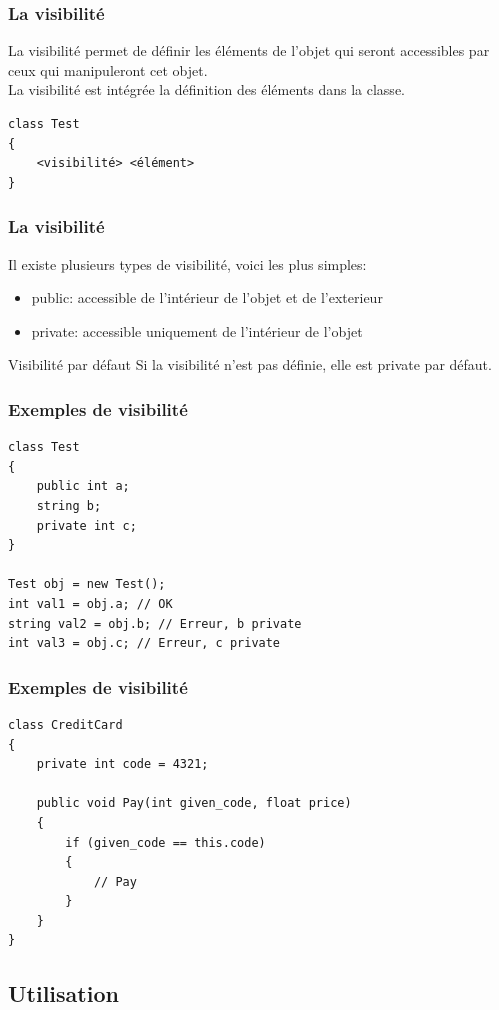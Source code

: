 \documentclass{beamer}
\begin{document}
\begin{frame}[fragile]
\frametitle{La visibilité}
La visibilité permet de définir les éléments de l'objet qui seront accessibles par ceux qui manipuleront cet objet.\\
La visibilité est intégrée la définition des éléments dans la classe.\\
\begin{lstlisting}
class Test
{
    <visibilité> <élément>
}
\end{lstlisting}
\end{frame}

\begin{frame}
\frametitle{La visibilité}
Il existe plusieurs types de visibilité, voici les plus simples:
\begin{itemize}
\item public: accessible de l'intérieur de l'objet et de l'exterieur
\item private: accessible uniquement de l'intérieur de l'objet
\end{itemize}
\begin{alertblock}{Visibilité par défaut}
Si la visibilité n'est pas définie, elle est private par défaut.
\end{alertblock}
\end{frame}

\begin{frame}[fragile]
\frametitle{Exemples de visibilité}
\begin{lstlisting}
class Test
{
    public int a;
    string b;
    private int c;
}

Test obj = new Test();
int val1 = obj.a; // OK
string val2 = obj.b; // Erreur, b private
int val3 = obj.c; // Erreur, c private
\end{lstlisting}

\end{frame}

\begin{frame}[fragile]
\frametitle{Exemples de visibilité}
\begin{lstlisting}
class CreditCard
{
    private int code = 4321;
    
    public void Pay(int given_code, float price)
    {
        if (given_code == this.code)
        {
            // Pay
        }
    }
}
\end{lstlisting}
\end{frame}

\subsection{Utilisation}
\end{document}
